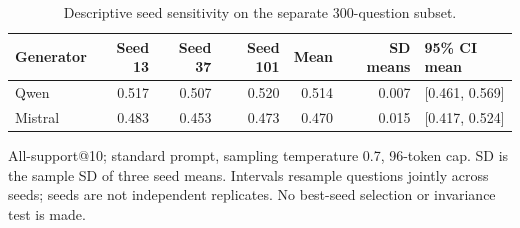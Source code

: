 \begin{table}[!htbp]
\centering\footnotesize
\caption{Descriptive seed sensitivity on the separate 300-question subset.}
\label{tab:mhrag_seeds}
\begin{threeparttable}
\setlength{\tabcolsep}{3pt}
\begin{tabular}{lrrrrrl}
\toprule
Generator & Seed 13 & Seed 37 & Seed 101 & Mean & SD means & 95\% CI mean \\
\midrule
Qwen & 0.517 & 0.507 & 0.520 & 0.514 & 0.007 & [0.461, 0.569] \\
Mistral & 0.483 & 0.453 & 0.473 & 0.470 & 0.015 & [0.417, 0.524] \\
\bottomrule
\end{tabular}
\begin{tablenotes}\scriptsize\item All-support@10; standard prompt, sampling temperature 0.7, 96-token cap. SD is the sample SD of three seed means. Intervals resample questions jointly across seeds; seeds are not independent replicates. No best-seed selection or invariance test is made.
\end{tablenotes}
\end{threeparttable}
\end{table}
